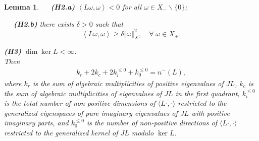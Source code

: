 \documentclass[1 [leqno, 11pt]{amsart}
\numberwithin{equation}{section}
\newtheorem{lemma}[Theorem]{Lemma}
\begin{document}
\begin{CJK*}{GBK}{song}
\begin{lemma}
$\quad$ {\rm \textbf{(H2.a)}}
 $\left\langle L\omega ,\omega \right\rangle <0$ for all $\omega \in X_- \backslash \{0\}$;

$\quad$ {\rm \textbf{(H2.b)}} there exists $\delta >0$ such that
\[
\left\langle L\omega ,\omega \right\rangle \geq\delta \left\Vert \omega \right\Vert _{X}
^{2},\quad\forall \; \omega \in X_{+}.
\]


{\rm \textbf{(H3)}} $\dim\ker
L<\infty$.\\
Then
\begin{align}\label{index-formula}
k_r + 2k_c+2k_i^{\leq0}+k_0^{\leq0} = n^-(L),
\end{align}
where $k_r$ is the sum of algebraic multiplicities of positive eigenvalues of $JL$, $k_c$ is the sum of algebraic multiplicities of eigenvalues of $JL$ in the first quadrant, $k_i^{\leq 0}$ is the total number of non-positive dimensions of $\langle L\cdot, \cdot \rangle$ restricted to the generalized eigenspaces of pure imaginary eigenvalues of $JL$ with positive imaginary parts, and $k_0^{\leq 0}$ is the number of non-positive directions of $\langle L\cdot, \cdot \rangle$ restricted to the generalized kernel of $JL$ modulo $\ker L$.
\end{lemma}


\end{CJK*}
\end{document}
